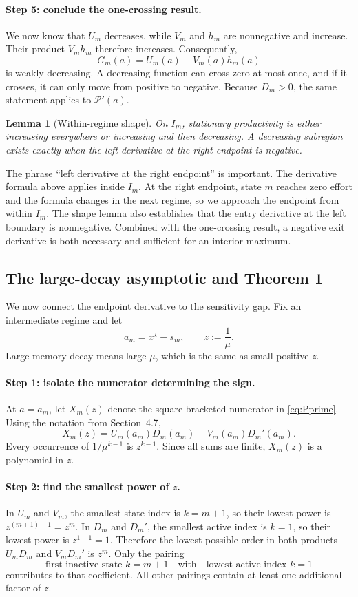 \documentclass[11pt]{article}
\theoremstyle{tutorial}
\newtheorem{lemma}[theorem]{Lemma}
\theoremstyle{remark}
\newcommand{\1}{\mathbb{I}}
\newcommand{\calP}{\mathcal{P}}
\begin{document}
\paragraph{Step 5: conclude the one-crossing result.}
We now know that $U_m$ decreases, while $V_m$ and $h_m$ are nonnegative and increase.  Their product
$V_mh_m$ therefore increases.  Consequently,
\[
  G_m(a)=U_m(a)-V_m(a)h_m(a)
\]
is weakly decreasing.  A decreasing function can cross zero at most once, and if it crosses, it can only
move from positive to negative.  Because $D_m>0$, the same statement applies to $\calP'(a)$.

\begin{lemma}[Within-regime shape]
On $I_m$, stationary productivity is either increasing everywhere or increasing and then decreasing.  A
decreasing subregion exists exactly when the left derivative at the right endpoint is negative.
\end{lemma}

The phrase ``left derivative at the right endpoint'' is important.  The derivative formula above applies
inside $I_m$.  At the right endpoint, state $m$ reaches zero effort and the formula changes in the next
regime, so we approach the endpoint from within $I_m$.  The shape lemma also establishes that the entry
derivative at the left boundary is nonnegative.  Combined with the one-crossing result, a negative exit
derivative is both necessary and sufficient for an interior maximum.

\subsection{The large-decay asymptotic and Theorem 1}

We now connect the endpoint derivative to the sensitivity gap.  Fix an intermediate regime and let
\[
  a_m=x^\star-s_m,
  \qquad z:=\frac1\mu.
\]
Large memory decay means large $\mu$, which is the same as small positive $z$.

\paragraph{Step 1: isolate the numerator determining the sign.}
At $a=a_m$, let $X_m(z)$ denote the square-bracketed numerator in \eqref{eq:Pprime}.  Using the notation
from Section~4.7,
\[
X_m(z)=U_m(a_m)D_m(a_m)-V_m(a_m)D_m'(a_m).
\]
Every occurrence of $1/\mu^{k-1}$ is $z^{k-1}$.  Since all sums are finite, $X_m(z)$ is a polynomial in
$z$.

\paragraph{Step 2: find the smallest power of $z$.}
In $U_m$ and $V_m$, the smallest state index is $k=m+1$, so their lowest power is
$z^{(m+1)-1}=z^m$.  In $D_m$ and $D_m'$, the smallest active index is $k=1$, so their lowest power is
$z^{1-1}=1$.  Therefore the lowest possible order in both products $U_mD_m$ and $V_mD_m'$ is $z^m$.
Only the pairing
\[
  \text{first inactive state }k=m+1
  \quad\text{with}\quad
  \text{lowest active index }k=1
\]
contributes to that coefficient.  All other pairings contain at least one additional factor of $z$.
\end{document}
